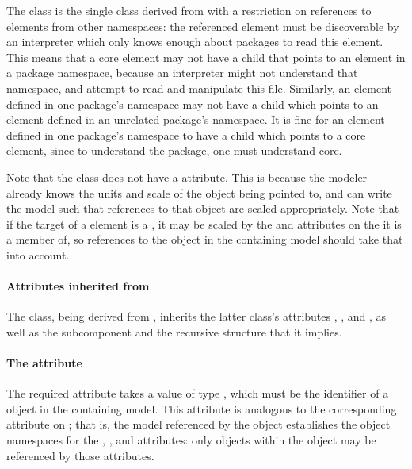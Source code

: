 The \ReplacedBy class is the single class derived from \SBaseRef with a
restriction on references to elements from other namespaces:  the referenced
element must be discoverable by an interpreter which only knows enough about
packages to read this element.  This means that a core element may not have
a \ReplacedBy child that points to an element in a package namespace, because
an interpreter might not understand that namespace, and attempt to read
and manipulate this file.  Similarly, an element defined in one package's
namespace may not have a \ReplacedBy child which points to an element 
defined in an unrelated package's namespace.  It is fine for an element 
defined in one package's namespace to have a \ReplacedBy child which points 
to a core element, since to understand the package, one must understand core.

Note that the \ReplacedBy class does not have a 
attribute.  This is because the modeler already knows the units
and scale of the object being pointed to, and can write the model such that 
references to that object are scaled appropriately.  Note that if the target
of a \ReplacedBy element is a \Reaction, it may be scaled by the
 and  attributes
on the \Submodel it is a member of, so references to the object in the
containing model should take that into account.

\paragraph{Attributes inherited from }

The \ReplacedBy class, being derived from \SBaseRef, inherits the latter
class's attributes , ,  and
, as well as the subcomponent  and the
recursive structure that it implies.  


\paragraph{The \fixttspace{} attribute}
\label{replacedby-submodelref}

The required attribute  takes a value of type
, which must be the identifier of a \Submodel object in
the containing model.  This attribute is analogous to the corresponding
attribute on \ReplacedElement; that is, the model referenced by the
\Submodel object establishes the object namespaces for the
, ,  and 
attributes: only objects within the \Model object may be referenced by
those attributes.


